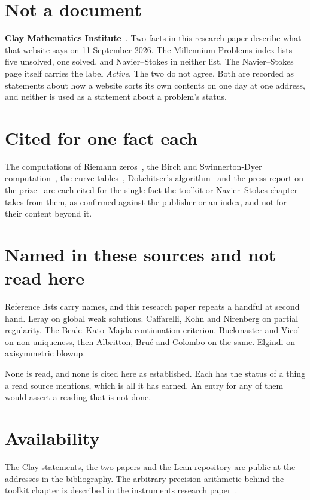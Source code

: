 \section{Not a document}

\textbf{Clay Mathematics Institute}~\cite{src:Clay-Mathematics-Institute}. Two facts in this
research paper describe what that website says on 11 September 2026. The Millennium Problems index
lists five unsolved, one solved, and Navier--Stokes in neither list. The Navier--Stokes page itself
carries the label \emph{Active}. The two do not agree. Both are recorded as statements about how a
website sorts its own contents on one day at one address, and neither is used as a statement about a
problem's status.

\section{Cited for one fact each}

The computations of Riemann zeros~\cite{src:Gourdon-2004,src:Odlyzko-2001,src:Platt-and-Trudgian-2021},
the Birch and Swinnerton-Dyer computation~\cite{src:Birch-and-Swinnerton-Dyer-1965}, the curve
tables~\cite{src:Cremona-1997}, Dokchitser's algorithm~\cite{src:Dokchitser-2004} and the press
report on the prize~\cite{src:RITS-2026} are each cited for the single fact the toolkit or
Navier--Stokes chapter takes from them, as confirmed against the publisher or an index, and not for
their content beyond it.

\section{Named in these sources and not read here}

Reference lists carry names, and this research paper repeats a handful at second hand. Leray on global
weak solutions. Caffarelli, Kohn and Nirenberg on partial regularity. The Beale--Kato--Majda
continuation criterion. Buckmaster and Vicol on non-uniqueness, then Albritton, Bru\'e and Colombo on
the same. Elgindi on axisymmetric blowup.

None is read, and none is cited here as established. Each has the status of a thing a read source
mentions, which is all it has earned. An entry for any of them would assert a reading that is not
done.

\section{Availability}

The Clay statements, the two papers and the Lean repository are public at the addresses in the
bibliography. The arbitrary-precision arithmetic behind the toolkit chapter is described in the
instruments research paper~\cite{src:Quigg-instruments}.
